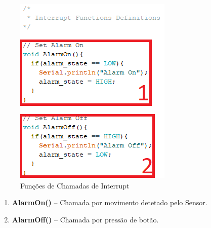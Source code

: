 \begin{figure}[H]
    \centering
    \includegraphics{images/codigo/sisD_interrupts.png}
    \caption{Funções de Chamadas de Interrupt}
    \label{fig:my_label}
\end{figure}


\begin{enumerate}
    \item \textbf{AlarmOn()} -- Chamada por movimento detetado pelo Sensor.
    \item \textbf{AlarmOff()} -- Chamada por pressão de botão.
\end{enumerate}